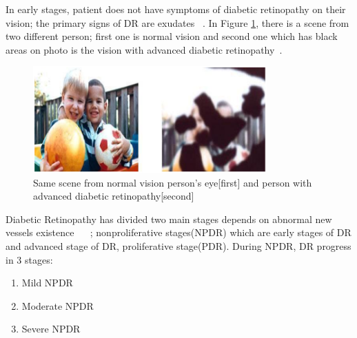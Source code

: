 In early stages, patient does not have symptoms of diabetic retinopathy on their vision; the primary signs of DR are exudates ~\cite{nijalingappa2015machine}. In Figure \ref{visionOfDrAndNodr}, there is a scene from two different person; first one is normal vision and second one which has black areas on photo is the vision with advanced diabetic retinopathy~\cite{NationalEyeInstitute}. 

\begin{figure}[t]
\caption{Same scene from normal vision person's eye[first] and person with advanced diabetic retinopathy[second]}
\label{visionOfDrAndNodr}
\centering
\includegraphics[width=0.8\textwidth]{Figures/vision_of_dr_and_nodr}
\end{figure}

Diabetic Retinopathy has divided two main stages depends on abnormal new vessels existence  ~\cite{tang2011inflammation} ~\cite{nijalingappa2015machine}; nonproliferative stages(NPDR) which are early stages of DR and advanced stage of DR, proliferative stage(PDR). 
During NPDR, DR progress in 3 stages:

    \begin{enumerate}
        \item Mild NPDR
        \item Moderate NPDR
        \item Severe NPDR
    \end{enumerate}


